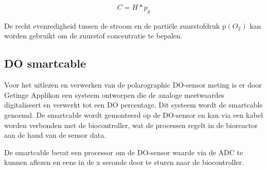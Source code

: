 \begin{equation}\label{eq:henry}
	C = H*p_g
\end{equation}	

De recht evenredigheid tussen de stroom en de partiële zuurstofdruk p$(O_2)$ kan worden gebruikt om de zuurstof concentratie te bepalen. 

\subsection{DO smartcable}
Voor het uitlezen en verwerken van de polarographic DO-sensor meting is er door Getinge Applikon een systeem ontworpen die de analoge meetwaardes digitaliseert en verwerkt tot een DO percentage. Dit systeem wordt de smartcable genoemd. De smartcable wordt gemonteerd op de DO-sensor en kan via een kabel worden verbonden met de biocontroller, wat de processen regelt in de bioreactor aan de hand van de sensor data. 

De smartcable bevat een processor om de DO-sensor waarde via de ADC te kunnen aflezen en eens in de x seconde door te sturen naar de biocontroller. 


%
%
%
%
%
%
%
